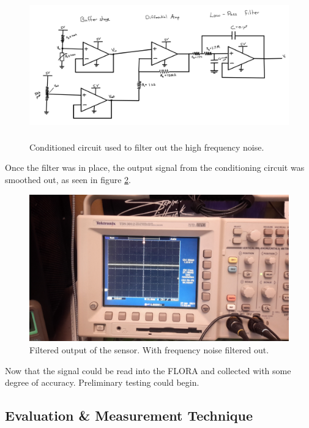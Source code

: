 \documentclass[12pt,a4paper]{report}
\begin{document}
\begin{figure}[h!]
    \centering
    \includegraphics[height = 2.5in]{Images/ThermistorFilter.png}
    \caption{Conditioned circuit used to filter out the high frequency noise.}
    \label{fig:ConditioningCircuit}
\end{figure}

Once the filter was in place, the output signal from the conditioning circuit was smoothed out, as seen in figure \ref{fig:FilteredOutput}. 


\begin{figure}[h!]
    \centering
    \includegraphics[height = 2.5in]{Images/TempSensOutFiltered.jpg}
    \caption{Filtered output of the sensor. With frequency noise filtered out.}
    \label{fig:FilteredOutput}
\end{figure}

 Now that the signal could be read into the FLORA and collected with some degree of accuracy. Preliminary testing could begin.






\subsection{Evaluation \& Measurement Technique}
\end{document}
